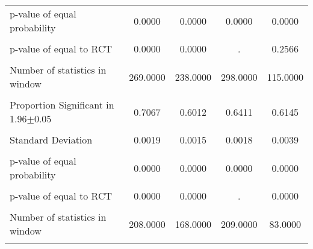 {\begin{tabular}{l*{4}{c}}
p-value of equal probability&   0.0000         &   0.0000         &   0.0000         &   0.0000         \\
                &                  &                  &                  &                  \\
p-value of equal to RCT&   0.0000         &   0.0000         &        .         &   0.2566         \\
                &                  &                  &                  &                  \\
Number of statistics in window& 269.0000         & 238.0000         & 298.0000         & 115.0000         \\
                &                  &                  &                  &                  \\
\hline Proportion Significant in 1.96$\pm$0.05&   0.7067         &   0.6012         &   0.6411         &   0.6145         \\
                &                  &                  &                  &                  \\
Standard Deviation&   0.0019         &   0.0015         &   0.0018         &   0.0039         \\
                &                  &                  &                  &                  \\
p-value of equal probability&   0.0000         &   0.0000         &   0.0000         &   0.0000         \\
                &                  &                  &                  &                  \\
p-value of equal to RCT&   0.0000         &   0.0000         &        .         &   0.0000         \\
                &                  &                  &                  &                  \\
Number of statistics in window& 208.0000         & 168.0000         & 209.0000         &  83.0000         \\
                &                  &                  &                  &                  \\
\hline\hline
\end{tabular}
}
